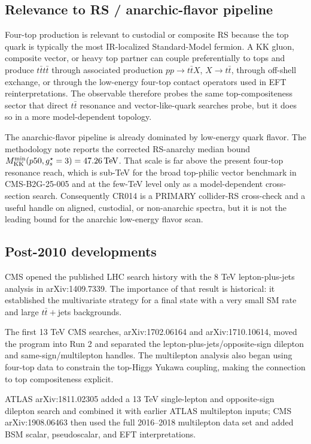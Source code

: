 \subsection*{Relevance to RS / anarchic-flavor pipeline}
Four-top production is relevant to custodial or composite RS because the top
quark is typically the most IR-localized Standard-Model fermion.  A KK gluon,
composite vector, or heavy top partner can couple preferentially to tops and
produce \(t\bar t t\bar t\) through associated production
\(pp\to t\bar t X\), \(X\to t\bar t\), through off-shell exchange, or through
the low-energy four-top contact operators used in EFT reinterpretations.  The
observable therefore probes the same top-compositeness sector that direct
\(t\bar t\) resonance and vector-like-quark searches probe, but it does so in a
more model-dependent topology.

The anarchic-flavor pipeline is already dominated by low-energy quark flavor.
The methodology note reports the corrected RS-anarchy median bound
\(M_{\rm KK}^{\min}(p50,g_s^\star=3)=47.26\,\mathrm{TeV}\).  That scale is far
above the present four-top resonance reach, which is sub-TeV for the broad
top-philic vector benchmark in CMS-B2G-25-005 and at the few-TeV level only as a
model-dependent cross-section search.  Consequently CR014 is a PRIMARY
collider-RS cross-check and a useful handle on aligned, custodial, or
non-anarchic spectra, but it is not the leading bound for the anarchic
low-energy flavor scan.

\subsection*{Post-2010 developments}
CMS opened the published LHC search history with the 8 TeV lepton-plus-jets
analysis in arXiv:1409.7339.  The importance of that result is historical: it
established the multivariate strategy for a final state with a very small SM
rate and large \(t\bar t+\)jets backgrounds.

The first 13 TeV CMS searches, arXiv:1702.06164 and arXiv:1710.10614, moved the
program into Run 2 and separated the lepton-plus-jets/opposite-sign dilepton
and same-sign/multilepton handles.  The multilepton analysis also began using
four-top data to constrain the top-Higgs Yukawa coupling, making the connection
to top compositeness explicit.

ATLAS arXiv:1811.02305 added a 13 TeV single-lepton and opposite-sign dilepton
search and combined it with earlier ATLAS multilepton inputs; CMS
arXiv:1908.06463 then used the full 2016--2018 multilepton data set and added
BSM scalar, pseudoscalar, and EFT interpretations.

